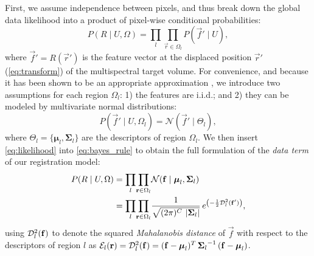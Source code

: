First, we assume independence between pixels, and thus break down the
  global data likelihood into a product of pixel-wise conditional probabilities:
  \begin{equation}
  P(R \mid U,\Omega) = \underset{l}{\prod} \underset{\vec{r}\in \Omega_l}{\prod}
    P\left( \vec{f}' \mid U \right),
  \label{eq:bayes_aposteriori}
  \end{equation}
  where $\vec{f}' = R(\vec{r}')$ is the feature vector at the displaced
  position $\vec{r}'$ (\autoref{eq:transform}) of the multispectral target
  volume.
For convenience, and because it has been shown to be an appropriate approximation
  \citep{leemput_automated_1999,cuadra_comparison_2005}, we introduce two assumptions for each
  region $\Omega_l$:
  1) the features are i.i.d.; and 2) they can be modeled by multivariate normal
  distributions:
  \begin{equation}
  P\left( \vec{f}' \mid U,\Omega_l \right) = \mathcal{N} \left( \vec{f}' \mid \Theta_l \right),
  \label{eq:likelihood}
  \end{equation}
 	where $\Theta_l = \lbrace \boldsymbol{\mu}_l, \boldsymbol{\Sigma}_{l} \rbrace$ are the
 	descriptors of region $\Omega_l$.
We then insert \autoref{eq:likelihood} into \autoref{eq:bayes_rule} to obtain the full
  formulation of the \emph{data term} of our registration model:
 	\begin{align}
  P( R \mid U, \Omega ) &= \underset{l}{\prod} \underset{\vec{r} \in \Omega_l}{\prod}
  \mathcal{N} ( \vec{f} \mid \boldsymbol{\mu}_l, \boldsymbol{\Sigma}_{l} ) \notag\\
  &= \underset{l}{\prod} \underset{\vec{r} \in \Omega_l}{\prod} \frac{1}{ \sqrt{(2\pi)^{C}\,\left|\boldsymbol{\Sigma}_{l}\right|}}\,{e^{\left(-\frac{1}{2}
  \mdist{f'}{l} \right)}},
  \label{eq:pdf}
  \end{align}
  using $\mdist{f}{l}$ to denote the squared \emph{Mahalanobis distance} of $\vec{f}$ with respect
  to the descriptors of region $l$ as
  $\mathcal{E}_l(\vec{r}) = \mdist{f}{l} = (\vec{f} - \boldsymbol{\mu}_l)^T \, {\boldsymbol{\Sigma}_l}^{-1} \, (\vec{f} - \boldsymbol{\mu}_l)$.


